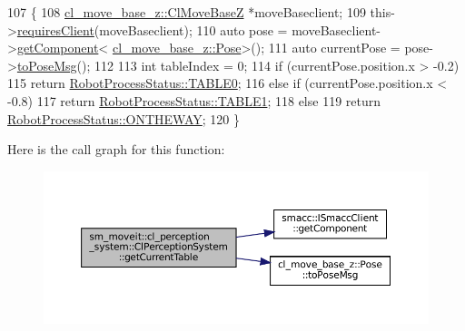 \begin{DoxyCode}
107     \{
108         \hyperlink{classcl__move__base__z_1_1ClMoveBaseZ}{cl\_move\_base\_z::ClMoveBaseZ} *moveBaseclient;
109         this->\hyperlink{classsmacc_1_1ISmaccClient_a7a9990a2f3e35d547671188d69fee520}{requiresClient}(moveBaseclient);
110         \textcolor{keyword}{auto} pose = moveBaseclient->\hyperlink{classsmacc_1_1ISmaccClient_adef78db601749ca63c19e74a27cb88cc}{getComponent}<
      \hyperlink{classcl__move__base__z_1_1Pose}{cl\_move\_base\_z::Pose}>();
111         \textcolor{keyword}{auto} currentPose = pose->\hyperlink{classcl__move__base__z_1_1Pose_a9faf8c6b437ff6b19c8bddd692908dca}{toPoseMsg}();
112 
113         \textcolor{keywordtype}{int} tableIndex = 0;
114         \textcolor{keywordflow}{if} (currentPose.position.x > -0.2)
115             \textcolor{keywordflow}{return} \hyperlink{namespacesm__moveit_1_1cl__perception__system_a730c3fd4da64d10a75ca4ab014fdbe40a1fd65c0ced0ead229bf6dd6a59067a4f}{RobotProcessStatus::TABLE0};
116         \textcolor{keywordflow}{else} \textcolor{keywordflow}{if} (currentPose.position.x < -0.8)
117             \textcolor{keywordflow}{return} \hyperlink{namespacesm__moveit_1_1cl__perception__system_a730c3fd4da64d10a75ca4ab014fdbe40a5b22e42e5d94a94037a4486a4976c49d}{RobotProcessStatus::TABLE1};
118         \textcolor{keywordflow}{else}
119             \textcolor{keywordflow}{return} \hyperlink{namespacesm__moveit_1_1cl__perception__system_a730c3fd4da64d10a75ca4ab014fdbe40a92f7ea3097b3fdb1b7a25669cfc1b8bd}{RobotProcessStatus::ONTHEWAY};
120     \}
\end{DoxyCode}
Here is the call graph for this function\+:
\nopagebreak
\begin{figure}[H]
\begin{center}
\leavevmode
\includegraphics[width=350pt]{classsm__moveit_1_1cl__perception__system_1_1ClPerceptionSystem_a2eb71e292ac7aca0c71dc71d84f38bea_cgraph}
\end{center}
\end{figure}
\mbox{\label{classsm__moveit_1_1cl__perception__system_1_1ClPerceptionSystem_a4c489e34241bc43c865f06a437827aa9}} 
